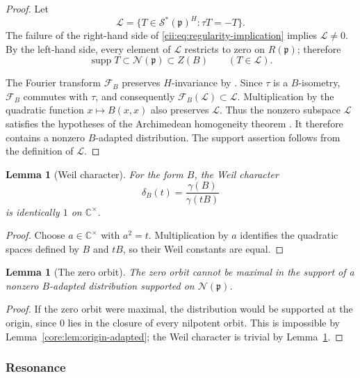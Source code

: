 \documentclass[11pt,reqno]{amsart}
\numberwithin{equation}{section}
\newtheorem{lemma}[theorem]{Lemma}
\theoremstyle{definition}
\theoremstyle{remark}
\newcommand{\C}{\mathbb C}
\newcommand{\supp}{\operatorname{supp}}
\newcommand{\cN}{\mathcal N}
\newcommand{\cS}{\mathcal S}
\begin{document}
\begin{proof}
Let
\[
\mathcal L
=
\{T\in\cS^*(\mathfrak p)^H:\tau T=-T\}.
\]
The failure of the right-hand side of
\eqref{cii:eq:regularity-implication} implies \(\mathcal L\neq0\).
By the left-hand side, every element of \(\mathcal L\) restricts to zero
on \(R(\mathfrak p)\); therefore
\[
\supp T\subset\cN(\mathfrak p)\subset Z(B)
\qquad(T\in\mathcal L).
\]

The Fourier transform \(\mathcal F_B\) preserves \(H\)-invariance by
\cite[Lemma~5.1.8]{AG09}.  Since \(\tau\) is a \(B\)-isometry,
\(\mathcal F_B\) commutes with \(\tau\), and consequently
\(\mathcal F_B(\mathcal L)\subset\mathcal L\).
Multiplication by the quadratic function \(x\mapsto B(x,x)\) also
preserves \(\mathcal L\).  Thus the nonzero subspace \(\mathcal L\)
satisfies the hypotheses of the Archimedean homogeneity theorem
\cite[Theorem~5.1.7]{AG09}.  It therefore contains a nonzero
\(B\)-adapted distribution.  The support assertion follows from the
definition of \(\mathcal L\).
\end{proof}

\begin{lemma}[Weil character]\label{cii:lem:weil-trivial}
For the form \(B\), the Weil character
\[
\delta_B(t)=\frac{\gamma(B)}{\gamma(tB)}
\]
is identically \(1\) on \(\C^\times\).
\end{lemma}

\begin{proof}
Choose \(a\in\C^\times\) with \(a^2=t\).  Multiplication by \(a\) identifies
the quadratic spaces defined by \(B\) and \(tB\), so their Weil constants
are equal.
\end{proof}

\begin{lemma}[The zero orbit]\label{cii:lem:zero-orbit}
The zero orbit cannot be maximal in the support of a nonzero
$B$-adapted distribution supported on $\cN(\mathfrak p)$.
\end{lemma}

\begin{proof}
If the zero orbit were maximal, the distribution would be supported at the
origin, since $0$ lies in the closure of every nilpotent orbit.  This is
impossible by Lemma~\ref{core:lem:origin-adapted}; the Weil character is
trivial by Lemma~\ref{cii:lem:weil-trivial}.
\end{proof}

\subsubsection{Resonance}
\end{document}

